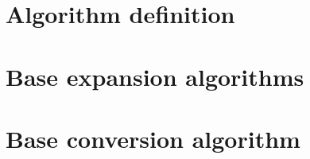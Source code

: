
\section*{Algorithm definition}

\vfill
\section*{Base expansion algorithms}

\vfill
\section*{Base conversion algorithm}

\vfill

